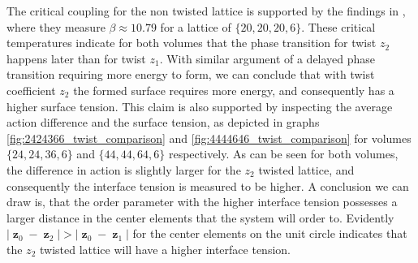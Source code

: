 \documentclass[english,twoside,openright]{UH_TCM_MSc}
\DeclareMathOperator{\z}{\mathbf{z}}
\begin{document}
The critical coupling for the non twisted lattice is supported by the findings in \cite{Ohta_2000}, where they measure $\beta \approx 10.79$ for a lattice of $\{20,20,20,6\}$. These critical temperatures indicate for both volumes that the phase transition for twist $z_2$ happens later than for twist $z_1$. With similar argument of a delayed phase transition requiring more energy to form, we can conclude that with twist coefficient $z_2$ the formed surface requires more energy, and consequently has a higher surface tension. This claim is also supported by inspecting the average action difference and the surface tension, as depicted in graphs \ref{fig:2424366_twist_comparison} and \ref{fig:4444646_twist_comparison} for volumes $\{24,24,36,6\}$ and $\{44,44,64,6\}$ respectively. As can be seen for both volumes, the difference in action is slightly larger for the $z_2$ twisted lattice, and consequently the interface tension is measured to be higher. A conclusion we can draw is, that the order parameter with the higher interface tension possesses a larger distance in the center elements that the system will order to. Evidently $|\z_0 - \z_2| > |\z_0 - \z_1|$ for the center elements on the unit circle indicates that the $z_2$ twisted lattice will have a higher interface tension.
\end{document}
